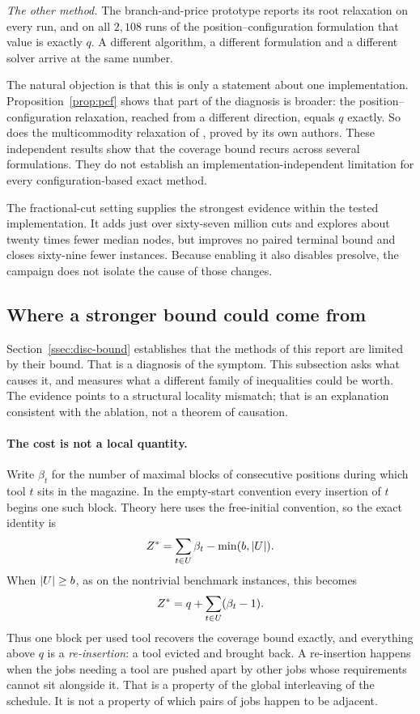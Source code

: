 \emph{The other method.} The branch-and-price prototype reports its root relaxation on
every run, and on all $2{,}108$ runs of the position--configuration formulation that
value is exactly $q$. A different algorithm, a different formulation and a different
solver arrive at the same number.

The natural objection is that this is only a statement about one implementation.
Proposition~\ref{prop:pcf} shows that part of the diagnosis is broader: the
position--configuration relaxation, reached from a different direction, equals $q$
exactly. So does the multicommodity relaxation of \citet{daSilva2024}, proved by its own
authors. These independent results show that the coverage bound recurs across several
formulations. They do not establish an implementation-independent limitation for every
configuration-based exact method.

The fractional-cut setting supplies the strongest evidence within the tested
implementation. It adds just over sixty-seven million cuts and explores about twenty times
fewer median nodes, but improves no paired terminal bound and closes sixty-nine fewer
instances. Because enabling it also disables presolve, the campaign does not isolate
the cause of those changes.

\subsection{Where a stronger bound could come from}\label{ssec:disc-locality}

Section~\ref{ssec:disc-bound} establishes that the methods of this report are limited
by their bound. That is a diagnosis of the symptom. This subsection asks what causes
it, and measures what a different family of inequalities could be worth. The evidence
points to a structural locality mismatch; that is an explanation consistent with the
ablation, not a theorem of causation.

\paragraph{The cost is not a local quantity.}
Write $\beta_t$ for the number of maximal blocks of consecutive positions during which
tool $t$ sits in the magazine. In the empty-start convention every insertion of $t$
begins one such block. Theory here uses the free-initial convention, so the exact
identity is
\[
  Z^{\ast}
  = \sum_{t\in U}\beta_t-\min(b,\lvert U\rvert).
\]
When $\lvert U\rvert\ge b$, as on the nontrivial benchmark instances, this becomes
\[
  Z^{\ast}=q+\sum_{t\in U}(\beta_t-1).
\]
Thus one block per used tool recovers the coverage bound exactly, and everything above
$q$ is a
\emph{re-insertion}: a tool evicted and brought back. A re-insertion happens when the
jobs needing a tool are pushed apart by other jobs whose requirements cannot sit
alongside it. That is a property of the global interleaving of the schedule. It is not
a property of which pairs of jobs happen to be adjacent.

